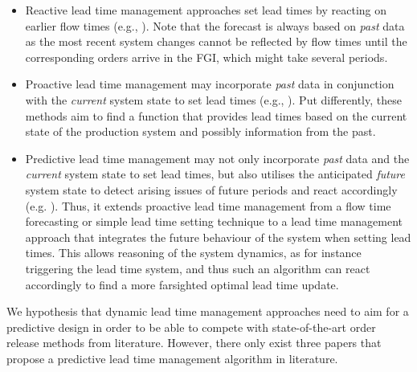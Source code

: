 \documentclass[envcountsame]{llncs}
\begin{document}
\begin{itemize}
\item \textsf{Reactive lead time management} approaches set lead times by reacting on
  earlier flow times (e.g., \citealt{enns2004work, Selcuk2006}). Note that the forecast is always
  based on \textit{past} data as the most recent system changes cannot be reflected by flow times
  until the corresponding orders arrive in the FGI, which might take several
  periods.
\item
  \textsf{Proactive lead time management} may incorporate \textit{past} data in conjunction with
  the \textit{current} system state to set lead times (e.g., \citealt{Bertrand1983,
    ChungHuang2002}). Put differently, these methods aim to find a function that provides lead times
  based on the current state of the production system and possibly information from the past.

\item \textsf{Predictive lead time management} may not only incorporate \textit{past} data and the
  \textit{current} system state to set lead times, but also utilises the anticipated \textit{future}
  system state to detect arising issues of future periods and react accordingly (e.g.
  \citealt{PaterninaArboleda2001,schneckenreither2020order,Schneckenreither2019}). Thus, it extends
  proactive lead time management from a flow time forecasting or simple lead time setting technique
  to a lead time management approach that integrates the future behaviour of the system when setting
  lead times. This allows reasoning of the system dynamics, as for instance triggering the lead time
  system, and thus such an algorithm can react accordingly to find a more farsighted optimal lead
  time update.
\end{itemize}

We hypothesis that dynamic lead time management approaches need to aim for a predictive design in
order to be able to compete with state-of-the-art order release methods from literature. However,
there only exist three papers that propose a predictive lead time management algorithm in
literature.
\end{document}
